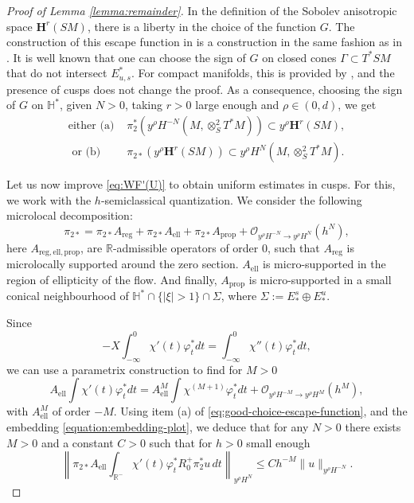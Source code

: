 \documentclass[10pt]{amsart}
\newcommand{\bH}{\boldsymbol{H}}
\newcommand{\R}{\mathbb{R}}
\newcommand{\HH}{\mathbb{H}}
\theoremstyle{plain}
\theoremstyle{definition}
\begin{document}
\begin{proof}[Proof of Lemma \ref{lemma:remainder}]
In the definition of the Sobolev anisotropic space $\bH^r(SM)$, there is a liberty in the choice of the function $G$. The construction of this escape function in \cite[\S 2.1]{Bonthonneau-Weich-17} is a construction in the same fashion as in \cite{Faure-Sjostrand-11}. It is well known that one can choose the sign of $G$ on closed cones $\Gamma\subset T^\ast SM$ that do not intersect $E^\ast_{u,s}$. For compact manifolds, this is provided by \cite[Lem.\,3.2]{Dang-Guillarmou-Riviere-Shen-19}, and the presence of cusps does not change the proof. As a consequence, choosing the sign of $G$ on $\HH^\ast$, given $N>0$, taking $r>0$ large enough and $\rho\in (0,d)$, we get
\begin{equation}\label{eq:good-choice-escape-function}
\begin{split}
\text{either (a) } & \pi_2^\ast (y^\rho H^{-N}(M,\otimes^2_S T^*M)) \subset y^\rho \bH^r(SM), \\
\text{ or (b) } & \pi_{2\ast} (y^\rho \bH^r(SM)) \subset y^\rho H^N(M,\otimes^2_S T^*M).
\end{split}
\end{equation}

Let us now improve \eqref{eq:WF'(U)} to obtain uniform estimates in cusps. For this, we work with the $h$-semiclassical quantization. We consider the following microlocal decomposition:
\[
\pi_{2\ast} = \pi_{2\ast}A_{\mathrm{reg}} + \pi_{2\ast}A_{\mathrm{ell}} + \pi_{2\ast}A_{\mathrm{prop}} + \mathcal{O}_{y^\rho H^{-N}\to y^\rho H^{N} }(h^N),
\]
here $A_{\mathrm{reg,ell,prop}}$, are $\R$-admissible operators of order $0$, such that $A_{\mathrm{reg}}$ is microlocally supported around the zero section. $A_{\mathrm{ell}}$ is micro-supported in the region of ellipticity of the flow. And finally, $A_{\mathrm{prop}}$ is micro-supported in a small conical neighbourhood of $\HH^\ast\cap\{|\xi|> 1\} \cap \Sigma$, where $\Sigma := E^s_* \oplus E^u_*$.

Since
\[
- X \int_{-\infty}^{0} \chi'(t) \varphi_t^\ast dt = \int_{-\infty}^{0} \chi''(t) \varphi_t^\ast dt,
\]
we can use a parametrix construction to find for $M>0$
\[
A_\mathrm{ell} \int \chi'(t) \varphi_t^\ast dt = A^M_\mathrm{ell} \int \chi^{(M+1)} \varphi_t^\ast dt + \mathcal{O}_{y^\rho H^{-M}\to y^\rho H^{M} }( h^M),
\]
with $A^M_\mathrm{ell}$ of order $-M$. Using item (a) of \eqref{eq:good-choice-escape-function}, and the embedding \eqref{equation:embedding-plot}, we deduce that for any $N>0$ there exists $M>0$ and a constant $C>0$ such that for $h>0$ small enough
\[
\left\|\pi_{2\ast} A_\mathrm{ell} \int_{\R^-} \chi'(t) \varphi_t^\ast R_0^+ \pi_2^\ast u\, dt \right\|_{y^\rho H^{N}} \leq C h^{-M} \| u \|_{y^\rho H^{-N}}.
\]


\end{proof}
\end{document}
